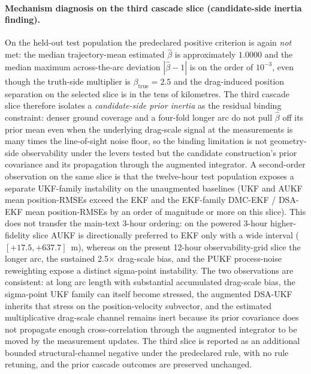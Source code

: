 \documentclass{article}
\begin{document}
\paragraph{Mechanism diagnosis on the third cascade slice (candidate-side inertia finding).}
On the held-out test population the predeclared positive criterion is again \emph{not} met: the median trajectory-mean estimated $\hat{\beta}$ is approximately $1.0000$ and the median maximum across-the-arc deviation $|\hat{\beta}-1|$ is on the order of $10^{-3}$, even though the truth-side multiplier is $\beta_{\mathrm{true}}=2.5$ and the drag-induced position separation on the selected slice is in the tens of kilometres. The third cascade slice therefore isolates a \emph{candidate-side prior inertia} as the residual binding constraint: denser ground coverage and a four-fold longer arc do not pull $\hat{\beta}$ off its prior mean even when the underlying drag-scale signal at the measurements is many times the line-of-sight noise floor, so the binding limitation is not geometry-side observability under the levers tested but the candidate construction's prior covariance and its propagation through the augmented integrator. A second-order observation on the same slice is that the twelve-hour test population exposes a separate UKF-family instability on the unaugmented baselines (UKF and AUKF mean position-RMSEs exceed the EKF and the EKF-family DMC-EKF / DSA-EKF mean position-RMSEs by an order of magnitude or more on this slice). This does not transfer the main-text 3-hour ordering: on the powered 3-hour higher-fidelity slice AUKF is directionally preferred to EKF only with a wide interval ($[+17.5,+637.7]$~m), whereas on the present 12-hour observability-grid slice the longer arc, the sustained 2.5$\times$ drag-scale bias, and the PUKF process-noise reweighting expose a distinct sigma-point instability. The two observations are consistent: at long arc length with substantial accumulated drag-scale bias, the sigma-point UKF family can itself become stressed, the augmented DSA-UKF inherits that stress on the position-velocity subvector, and the estimated multiplicative drag-scale channel remains inert because its prior covariance does not propagate enough cross-correlation through the augmented integrator to be moved by the measurement updates. The third slice is reported as an additional bounded structural-channel negative under the predeclared rule, with no rule retuning, and the prior cascade outcomes are preserved unchanged.
\end{document}
